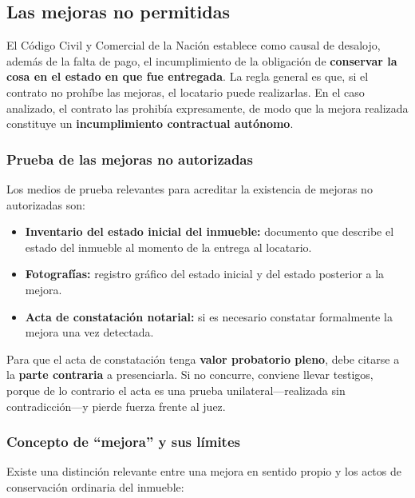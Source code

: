 \documentclass[12pt,oneside]{book}
\begin{document}
\subsection{Las mejoras no permitidas}

El Código Civil y Comercial de la Nación establece como causal de
desalojo, además de la falta de pago, el incumplimiento de la
obligación de \textbf{conservar la cosa en el estado en que fue
entregada}. La regla general es que, si el contrato no prohíbe las
mejoras, el locatario puede realizarlas. En el caso analizado, el
contrato las prohibía expresamente, de modo que la mejora realizada
constituye un \textbf{incumplimiento contractual autónomo}.

\subsubsection{Prueba de las mejoras no autorizadas}

Los medios de prueba relevantes para acreditar la existencia de mejoras
no autorizadas son:

\begin{itemize}
    \item \textbf{Inventario del estado inicial del inmueble:} documento
    que describe el estado del inmueble al momento de la entrega al
    locatario.
    \item \textbf{Fotografías:} registro gráfico del estado inicial y del
    estado posterior a la mejora.
    \item \textbf{Acta de constatación notarial:} si es necesario constatar
    formalmente la mejora una vez detectada.
\end{itemize}

\begin{important}
Para que el acta de constatación tenga \textbf{valor probatorio pleno},
debe citarse a la \textbf{parte contraria} a presenciarla. Si no
concurre, conviene llevar testigos, porque de lo contrario el acta
es una prueba unilateral---realizada sin contradicción---y pierde
fuerza frente al juez.
\end{important}

\subsubsection{Concepto de ``mejora'' y sus l\'imites}

Existe una distinción relevante entre una mejora en sentido propio y
los actos de conservación ordinaria del inmueble:
\end{document}

